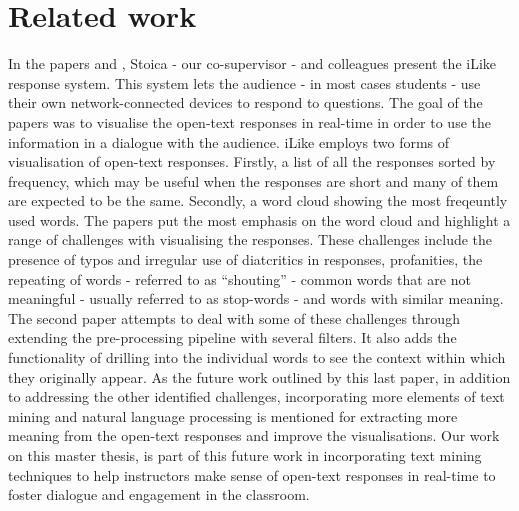 \chapter{Related work}\label{chap:relatedwork}

\begin{comment}
    1. What we base our work upon ✅
    2. Use of response systems ✅
    3. Sentiment analysis ✅
    4. Topic modelling + sentiment analysis ✅
    5. SETSUM -> More comprehensive ✅
    6. Assessment and feedback through LLM ✅
\end{comment}

In the papers \cite{stoica2016} and \cite{stoica2017}, Stoica - our co-supervisor - and colleagues present the iLike response system. This system lets the audience - in most cases students - use their own network-connected devices to respond to questions. The goal of the papers was to visualise the open-text responses in real-time in order to use the information in a dialogue with the audience. iLike employs two forms of visualisation of open-text responses. Firstly, a list of all the responses sorted by frequency, which may be useful when the responses are short and many of them are expected to be the same. Secondly, a word cloud showing the most freqeuntly used words. The papers put the most emphasis on the word cloud and highlight a range of challenges with visualising the responses. These challenges include the presence of typos and irregular use of diatcritics in responses, profanities, the repeating of words - referred to as ``shouting'' - common words that are not meaningful - usually referred to as stop-words - and words with similar meaning. The second paper \cite{stoica2017} attempts to deal with some of these challenges through extending the pre-processing pipeline with several filters. It also adds the functionality of drilling into the individual words to see the context within which they originally appear. As the future work outlined by this last paper, in addition to addressing the other identified challenges, incorporating more elements of text mining and natural language processing is mentioned for extracting more meaning from the open-text responses and improve the visualisations. Our work on this master thesis, is part of this future work in incorporating text mining techniques to help instructors make sense of open-text responses in real-time to foster dialogue and engagement in the classroom.

